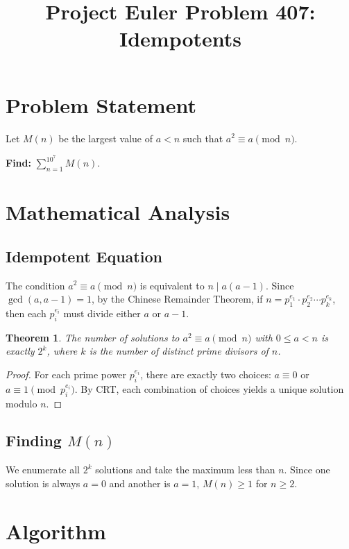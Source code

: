 \documentclass[11pt]{article}
\title{Project Euler Problem 407: Idempotents}
\author{}
\date{}
\newtheorem{theorem}{Theorem}
\theoremstyle{definition}
\begin{document}
\maketitle

\section{Problem Statement}

Let $M(n)$ be the largest value of $a < n$ such that $a^2 \equiv a \pmod{n}$.

\textbf{Find:} $\displaystyle\sum_{n=1}^{10^7} M(n)$.

\section{Mathematical Analysis}

\subsection{Idempotent Equation}

The condition $a^2 \equiv a \pmod{n}$ is equivalent to $n \mid a(a-1)$.
Since $\gcd(a, a-1) = 1$, by the Chinese Remainder Theorem, if
$n = p_1^{e_1} \cdot p_2^{e_2} \cdots p_k^{e_k}$,
then each $p_i^{e_i}$ must divide either $a$ or $a - 1$.

\begin{theorem}
The number of solutions to $a^2 \equiv a \pmod{n}$ with $0 \le a < n$ is exactly $2^k$,
where $k$ is the number of distinct prime divisors of $n$.
\end{theorem}

\begin{proof}
For each prime power $p_i^{e_i}$, there are exactly two choices: $a \equiv 0$ or $a \equiv 1 \pmod{p_i^{e_i}}$.
By CRT, each combination of choices yields a unique solution modulo $n$.
\end{proof}

\subsection{Finding $M(n)$}

We enumerate all $2^k$ solutions and take the maximum less than $n$.
Since one solution is always $a = 0$ and another is $a = 1$,
$M(n) \ge 1$ for $n \ge 2$.

\section{Algorithm}
\end{document}
